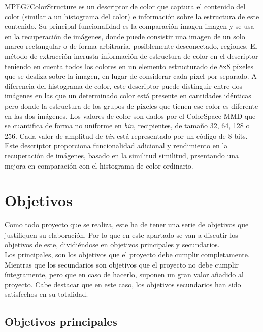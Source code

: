 MPEG7ColorStructure es un descriptor de color que captura el contenido del color (similar a un histograma del color) e información sobre la estructura de este contenido. Su principal funcionalidad es la comparación imagen-imagen y se usa en la recuperación de imágenes, donde puede consistir una imagen de un solo marco rectangular o de forma arbitraria, posiblemente desconectado, regiones. El método de extracción incrusta información de estructura de color en el descriptor teniendo en cuenta todos los colores en un elemento estructurado de 8x8 píxeles que se desliza sobre la imagen, en lugar de considerar cada píxel por separado. A diferencia del histograma de color, este descriptor puede distinguir entre dos imágenes en las que un determinado color está presente en cantidades idénticas pero donde la estructura de los grupos de píxeles que tienen ese color es diferente en las dos imágenes. Los valores de color son dados por el ColorSpace MMD que se cuantifica de forma no uniforme en \textit{bin}, recipientes, de tamaño 32, 64, 128 o 256. Cada valor de amplitud de \textit{bin} está representado por un código de 8 bits. Este descriptor proporciona funcionalidad adicional y rendimiento en la recuperación de imágenes, basado en la similitud similitud, prsentando una mejora en comparación con el histograma de color ordinario.

\section{Objetivos}

Como todo proyecto que se realiza, este ha de tener una serie de objetivos que justifiquen su elaboración. Por lo que en este apartado se van a discutir los objetivos de este, dividiéndose en objetivos principales y secundarios.\\

Los principales, son los objetivos que el proyecto debe cumplir completamente. Mientras que los secundarios son objetivos que el proyecto no debe cumplir íntegramente, pero que en caso de hacerlo, suponen un gran valor añadido al proyecto. Cabe destacar que en este caso, los objetivos secundarios han sido satisfechos en su totalidad.\\

\subsection{Objetivos principales}

